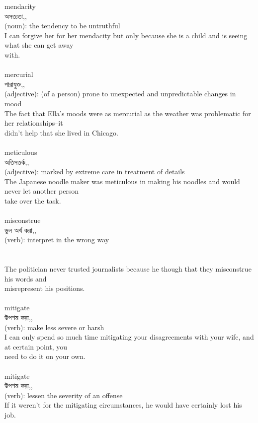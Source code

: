 \documentclass{article}
\begin{document}
{mendacity}\\
{অসত্যতা,,}\\
{(noun): the tendency to be untruthful\\I can forgive her for her mendacity but only because she is a child and is seeing what she can get away\\with.\\}\\
{mercurial}\\
{পারাযুক্ত,,}\\
{(adjective): (of a person) prone to unexpected and unpredictable changes in mood\\The fact that Ella's moods were as mercurial as the weather was problematic for her relationships--it\\didn't help that she lived in Chicago.\\}\\
{meticulous}\\
{অতিসতর্ক,,}\\
{(adjective): marked by extreme care in treatment of details\\The Japanese noodle maker was meticulous in making his noodles and would never let another person\\take over the task.\\}\\
{misconstrue}\\
{ভুল অর্থ করা,,}\\
{(verb): interpret in the wrong way\\\\                                                                               \\The politician never trusted journalists because he though that they misconstrue his words and\\misrepresent his positions.\\}\\
{mitigate}\\
{উপশম করা,,}\\
{(verb): make less severe or harsh\\I can only spend so much time mitigating your disagreements with your wife, and at certain point, you\\need to do it on your own.\\}\\
{mitigate}\\
{উপশম করা,,}\\
{(verb): lessen the severity of an offense\\If it weren't for the mitigating circumstances, he would have certainly lost his job.\\}\\
\end{document}
